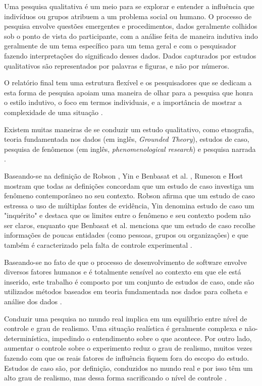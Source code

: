 Uma pesquisa qualitativa é um meio para se explorar e entender a influência que 
indivíduos ou grupos atribuem a um problema social ou humano. O processo de
pesquisa envolve questões emergentes e procedimentos, dados geralmente colhidos
sob o ponto de vista do participante, com a análise feita de maneira indutiva
indo  geralmente de um tema específico para um tema geral e com o pesquisador
fazendo interpretações do significado desses dados. Dados capturados por estudos
qualitativos são representados por palavras e figuras, e não por números.

O relatório final tem uma estrutura flexível e os pesquisadores que se
dedicam a esta forma de pesquisa apoiam uma maneira de olhar para a pesquisa que
honra o estilo indutivo, o foco em termos individuais, e a importância de mostrar a 
complexidade de uma situação \cite{creswell}. 

Existem muitas maneiras de se conduzir um estudo qualitativo, como etnografia,
teoria fundamentada nos dados (em inglês, \textit{Grounded Theory}), estudos de 
caso, pesquisa de fenômenos (em inglês, \textit{phenomenological research}) e 
pesquisa narrada \cite{creswell}. 

Baseando-se na definição de Robson \cite{robson}, Yin \cite{yin} e Benbasat et
al. \cite{benbasat}, Runeson e Host mostram que todas as definições concordam
que um estudo de caso investiga um fenômeno contemporâneo no seu contexto. 
Robson afirma que um estudo de caso estressa o uso de múltiplas fontes de
evidência, Yin denomina estudo de caso um "inquérito" e destaca que os limites 
entre o fenômeno e seu contexto podem não ser claros, enquanto que Benbasat et
al. menciona que um estudo de caso recolhe informações de poucas entidades 
(como pessoas, grupos ou organizações) e que também é caracterizado pela  falta
de controle experimental \cite{guidelines-case-study}.

Baseando-se no fato de que o processo de desenvolvimento de software envolve 
diversos fatores humanos e é totalmente sensível ao contexto em que ele está 
inserido, este trabalho é composto por um conjunto de estudos de caso, onde são 
utilizados métodos baseados em teoria fundamentada nos dados para colheta e
análise dos dados \cite{grounded-theory}.

Conduzir uma pesquisa no mundo real implica em um equilíbrio entre nível de
controle e grau de realismo. Uma situação realística é geralmente complexa e 
não-determinística, impedindo o entendimento sobre o que acontece. Por outro
lado, aumentar o controle sobre o experimento reduz o grau de realismo, muitos
vezes fazendo com que os reais fatores de influência fiquem fora do escopo do 
estudo. Estudos de caso são, por definição, conduzidos no mundo real e por isso 
têm um alto grau de realismo, mas dessa forma sacrificando o nível de  controle
\cite{guidelines-case-study}.

